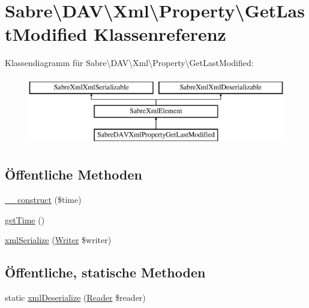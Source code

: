 \hypertarget{class_sabre_1_1_d_a_v_1_1_xml_1_1_property_1_1_get_last_modified}{}\section{Sabre\textbackslash{}D\+AV\textbackslash{}Xml\textbackslash{}Property\textbackslash{}Get\+Last\+Modified Klassenreferenz}
\label{class_sabre_1_1_d_a_v_1_1_xml_1_1_property_1_1_get_last_modified}
Klassendiagramm für Sabre\textbackslash{}D\+AV\textbackslash{}Xml\textbackslash{}Property\textbackslash{}Get\+Last\+Modified\+:\begin{figure}[H]
\begin{center}
\leavevmode
\includegraphics[height=3.000000cm]{class_sabre_1_1_d_a_v_1_1_xml_1_1_property_1_1_get_last_modified}
\end{center}
\end{figure}
\subsection*{Öffentliche Methoden}
\begin{DoxyCompactItemize}
\item 
\mbox{\hyperlink{class_sabre_1_1_d_a_v_1_1_xml_1_1_property_1_1_get_last_modified_a823274634fbc829cd388091994bc0060}{\+\_\+\+\_\+construct}} (\$time)
\item 
\mbox{\hyperlink{class_sabre_1_1_d_a_v_1_1_xml_1_1_property_1_1_get_last_modified_abd1d7359f75402fb533904a9350a30de}{get\+Time}} ()
\item 
\mbox{\hyperlink{class_sabre_1_1_d_a_v_1_1_xml_1_1_property_1_1_get_last_modified_a13dde5cac8cec9eca81c3a14f78fcea3}{xml\+Serialize}} (\mbox{\hyperlink{class_sabre_1_1_xml_1_1_writer}{Writer}} \$writer)
\end{DoxyCompactItemize}
\subsection*{Öffentliche, statische Methoden}
\begin{DoxyCompactItemize}
\item 
static \mbox{\hyperlink{class_sabre_1_1_d_a_v_1_1_xml_1_1_property_1_1_get_last_modified_a0856e52c758cb1bc236b65540005977e}{xml\+Deserialize}} (\mbox{\hyperlink{class_sabre_1_1_xml_1_1_reader}{Reader}} \$reader)
\end{DoxyCompactItemize}
